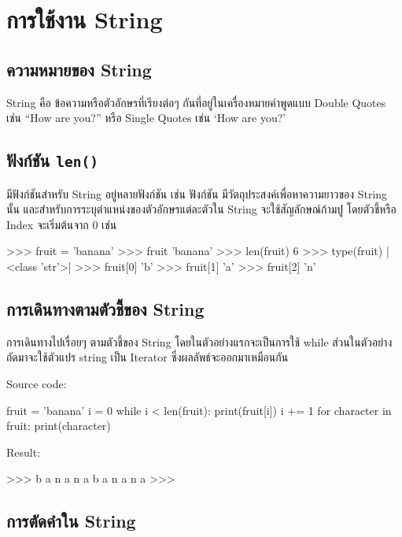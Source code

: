 \chapter{การใช้งาน String}
\section{ความหมายของ String}

String คือ ข้อความหรือตัวอักษรที่เรียงต่อๆ กันที่อยู่ในเครื่องหมายคำพูดแบบ Double Quotes เช่น “How are you?” หรือ Single Quotes เช่น ‘How are you?’ 

\section{ฟังก์ชัน \texttt{len()}}

มีฟังก์ชันสำหรับ String อยู่หลายฟังก์ชัน เช่น ฟังก์ชัน  มีวัตถุประสงค์เพื่อหาความยาวของ String นั้น และสำหรับการระบุตำแหน่งของตัวอักษรแต่ละตัวใน String จะใช้สัญลักษณ์ก้ามปู \pyinline{[ ]} โดยตัวชี้หรือ Index จะเริ่มต้นจาก 0 เช่น 

\begin{codelist}{}{}
>>> fruit = 'banana'
>>> fruit
'banana'
>>> len(fruit)
6
>>> type(fruit)
|<class \rq{}str\rq{}>|
>>> fruit[0]
'b'
>>> fruit[1]
'a'
>>> fruit[2]
'n'
\end{codelist}


\section{การเดินทางตามตัวชี้ของ String}

การเดินทางไปเรื่อยๆ ตามตัวชี้ของ String โดยในตัวอย่างแรกจะเป็นการใช้ while ส่วนในตัวอย่างถัดมาจะใช้ตัวแปร string เป็น Iterator ซึ่งผลลัพธ์จะออกมาเหมือนกัน

Source code:
\begin{codelist}{}{}
fruit = 'banana'
i = 0
while i < len(fruit):
    print(fruit[i])
    i += 1
for character in fruit: print(character)
\end{codelist}

Result:
\begin{codelist}{}{}
>>>
b
a
n
a
n
a
b
a
n
a
n
a
>>>
\end{codelist}



\section{การตัดคำใน String}

